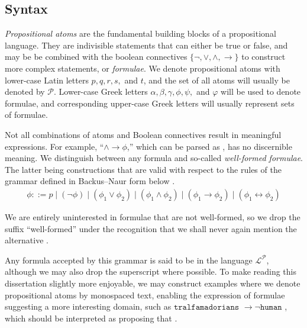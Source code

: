 \subsection{Syntax}
\label{subsection:syntax}   
  
  \textit{Propositional atoms} are the fundamental
building blocks of a propositional language. They are indivisible statements that can either be true or false, and may be
be combined with the boolean connectives $\{\neg, \lor, \land, \rightarrow \}$ to construct more complex statements, or
\textit{formulae}. We denote propositional atoms with lower-case Latin letters $p,q,r,s,$ and $t$, and the set of all atoms
will usually be denoted by $\mathcal{P}$. Lower-case Greek letters $\alpha, \beta, \gamma, \phi, \psi,$ and $\varphi$
will be used to denote formulae, and corresponding upper-case Greek letters will usually represent sets of formulae.

Not all combinations of atoms and Boolean connectives result in meaningful expressions. For example, ``$\land \rightarrow
\phi$,'' which can be parsed as , has no discernible meaning. We distinguish between
any formula and so-called \textit{well-formed formulae}. The latter being constructions that are valid with respect to the
rules of the grammar defined in Backus--Naur form below \cite[p. 33]{Huth_Ryan_2004}.
%
\begin{align}
	\phi ::= p \mid (\neg \phi) \mid (\phi_{1}\lor \phi_{2}) \mid (\phi_{1}\land \phi_{2}) \mid (\phi_{1}\rightarrow \phi_{2}) \mid (\phi_{1}\leftrightarrow \phi_{2})
\end{align}

We are entirely uninterested in formulae that are not well-formed, so we drop the suffix ``well-formed'' under the recognition
that we shall never again mention the alternative \cite[p. 33]{Huth_Ryan_2004}.

Any formula accepted by this grammar is said to be in the language $\mathcal{L}^{\mathcal{P}}$, although we may also
drop the superscript where possible. To make reading this dissertation slightly more enjoyable, we may construct
examples where we denote propositional atoms by monospaced text, enabling the expression of formulae suggesting a more interesting
domain, such as $\texttt{tralfamadorians }\rightarrow \neg \texttt{human }$, which should be interpreted as proposing that
.

